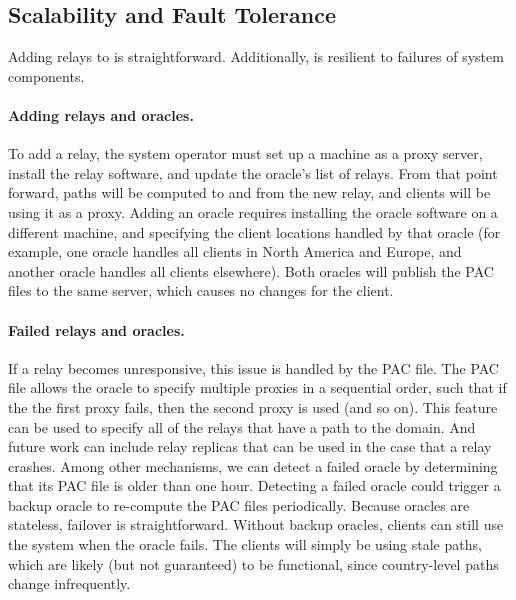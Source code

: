 \subsection{Scalability and Fault Tolerance}
Adding relays to \system{} is 
straightforward. Additionally, \system{} is resilient to failures of system components.

\paragraph{Adding relays and oracles.} To add a relay, the system
operator must set up a machine as a proxy server, install the \system{}
relay software, and update the oracle's list of relays.  From that point
forward, paths will be computed to and from the new relay, and clients
will be using it as a proxy.  Adding an oracle requires installing the
oracle software on a different machine, and specifying the client
locations handled by that oracle (for example, one oracle handles all
clients in North America and Europe, and another oracle handles all clients
elsewhere).  Both oracles will publish the PAC files to the same server,
which causes no changes for the client.

\paragraph{Failed relays and oracles.} If a relay becomes unresponsive,
this issue is handled by the PAC file.  The PAC file allows the oracle
to specify multiple proxies in a sequential order, such that if the the
first proxy fails, then the second proxy is used (and so on).  This
feature can be used to specify all of the relays that have a path to the
domain.  And future work can include relay replicas that can be used in
the case that a relay crashes.  Among other mechanisms, we can detect a
failed oracle by determining that its PAC file is older than one hour.
Detecting a failed oracle could trigger a backup oracle to re-compute
the PAC files periodically.  Because oracles are stateless, failover is
straightforward.  Without backup oracles, clients can still use the
system when the oracle fails.  The clients will simply be using stale
paths, which are likely (but not guaranteed) to be functional, since
country-level paths change infrequently.


